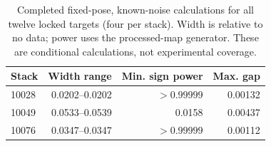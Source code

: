 \begin{table}[t]
\centering
\setlength{\tabcolsep}{4.5pt}
\caption{Completed fixed-pose, known-noise calculations for all twelve locked targets (four per stack). Width is relative to no data; power uses the processed-map generator. These are conditional calculations, not experimental coverage.}
\label{tab:lockedfixed}
\begin{tabular}{lrrr}
\toprule
Stack & Width range & Min. sign power & Max. gap\\
\midrule
10028 & 0.0202--0.0202 & $>0.99999$ & 0.00132\\
10049 & 0.0533--0.0539 & 0.0158 & 0.00437\\
10076 & 0.0347--0.0347 & $>0.99999$ & 0.00112\\
\bottomrule
\end{tabular}
\end{table}
